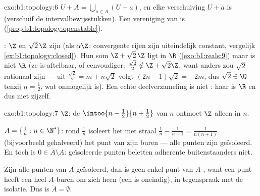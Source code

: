 \begin{solution}{exo:b1:topology:6}
$U + A = \bigcup_{a \in A} (U + a)$, en elke verschuiving $U + a$ is 
(verschuif de intervalbewijsstukken). Een vereniging van  is  (\cref{prop:b1:topology:openstable}).

: $\Z$ en $\sqrt 2\,\Z$ zijn  (als
$\alpha\Z$: convergente rijen zijn uiteindelijk constant, vergelijk
\cref{ex:b1:topology:closed}). Hun som $\Z + \sqrt 2\,\Z$ ligt  in
$\R$ (\cref{exo:b1:reals:9}) maar is niet $\R$ (ze is aftelbaar, of
eenvoudiger: $\frac{\sqrt 2}{2} \notin \Z + \sqrt2\Z$, want anders zou
$\sqrt 2$ rationaal zijn --- uit $\frac{\sqrt2}{2} = m + n\sqrt 2$ volgt
$(2n - 1)\sqrt 2 = -2m$, dus $\sqrt 2 \in \Q$ tenzij $n = \frac12$, wat
onmogelijk is). Een  echte deelverzameling is niet : haar
 is $\R$ en dus niet zijzelf.
\end{solution}

\begin{solution}{exo:b1:topology:7}
$\Z$: de  $\intoo{n - \frac12}{n + \frac12}$ van $n$ ontmoet $\Z$
alleen in $n$.

$A = \{\frac1n : n \in \N^*\}$: rond $\frac 1n$ isoleert het  met
straal $\frac{1}{n} - \frac{1}{n+1} = \frac{1}{n(n+1)}$ (bijvoorbeeld
gehalveerd) het punt van zijn buren --- alle punten zijn geïsoleerd. En
toch is $0 \in \overline A \setminus A$: geïsoleerde punten beletten
adherente buitenstaanders niet.

Zijn alle punten van $A$ geïsoleerd, dan is geen enkel punt van $A$
, want een  punt heeft een heel  $A$-buren om
zich heen (een  is oneindig), in tegenspraak met de isolatie. Dus
is $\mathring A = \emptyset$.
\end{solution}

